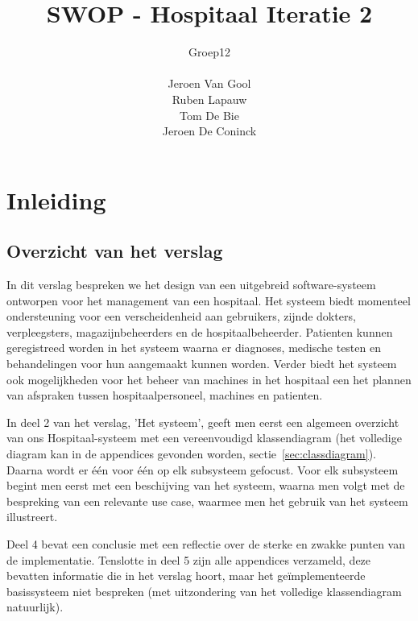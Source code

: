\documentclass[a4paper]{article}
\title{SWOP - Hospitaal Iteratie 2}
\author{Groep12\\ \\Jeroen Van Gool\\Ruben Lapauw\\Tom De Bie\\Jeroen De Coninck}
\date{}
\begin{document}
\maketitle
\newpage
\tableofcontents
\newpage

\section{Inleiding}
\subsection{Overzicht van het verslag}
In dit verslag bespreken we het design van een uitgebreid software-systeem ontworpen voor het management van een hospitaal. Het systeem biedt momenteel ondersteuning voor een verscheidenheid aan gebruikers, zijnde dokters, verpleegsters, magazijnbeheerders en de hospitaalbeheerder. Patienten kunnen geregistreed worden in het systeem waarna er diagnoses, medische testen en behandelingen voor hun aangemaakt kunnen worden. Verder biedt het systeem ook mogelijkheden voor het beheer van machines in het hospitaal een het plannen van afspraken tussen hospitaalpersoneel, machines en patienten.

In deel 2 van het verslag, 'Het systeem', geeft men eerst een algemeen overzicht van ons Hospitaal-systeem met een vereenvoudigd klassendiagram (het volledige diagram kan in de appendices gevonden worden, sectie~\ref{sec:classdiagram}). Daarna wordt er \'e\'en voor \'e\'en op elk subsysteem gefocust.
Voor elk subsysteem begint men eerst met een beschijving van het systeem, waarna men volgt met de bespreking van een relevante use case, waarmee men het gebruik van het systeem illustreert.

Deel 4 bevat een conclusie met een reflectie over de sterke en zwakke punten van de implementatie. Tenslotte in deel 5 zijn alle appendices verzameld, deze bevatten informatie die in het verslag hoort, maar het ge\"implementeerde basissysteem niet bespreken (met uitzondering van het volledige klassendiagram natuurlijk).
\end{document}
